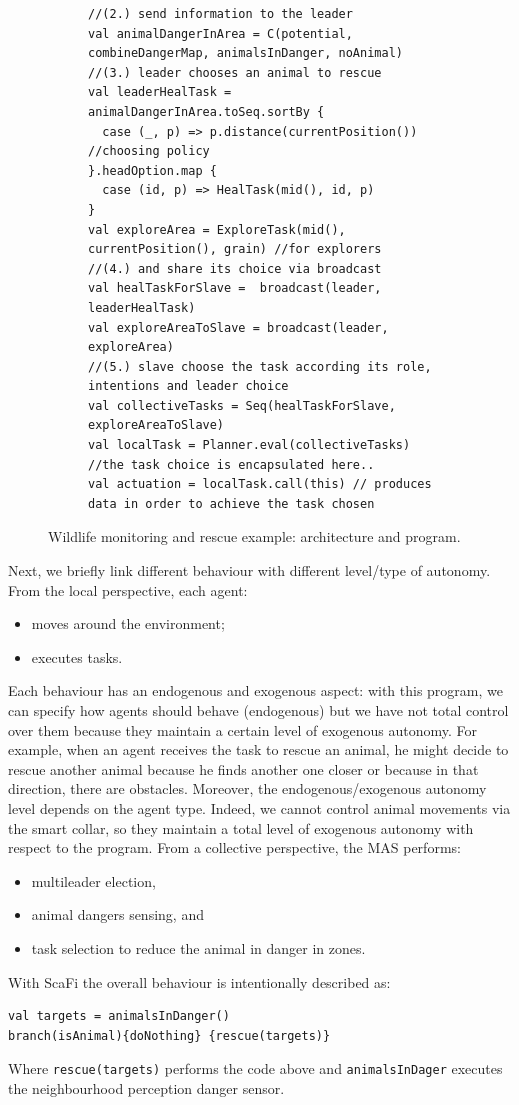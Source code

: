 \begin{figure}[t!]
\begin{subfigure}[b]{\textwidth}
\begin{lstlisting}
//(2.) send information to the leader
val animalDangerInArea = C(potential, combineDangerMap, animalsInDanger, noAnimal)
//(3.) leader chooses an animal to rescue
val leaderHealTask = animalDangerInArea.toSeq.sortBy {
  case (_, p) => p.distance(currentPosition()) //choosing policy
}.headOption.map {
  case (id, p) => HealTask(mid(), id, p)
}
val exploreArea = ExploreTask(mid(), currentPosition(), grain) //for explorers
//(4.) and share its choice via broadcast
val healTaskForSlave =  broadcast(leader, leaderHealTask)
val exploreAreaToSlave = broadcast(leader, exploreArea)
//(5.) slave choose the task according its role, intentions and leader choice
val collectiveTasks = Seq(healTaskForSlave, exploreAreaToSlave)
val localTask = Planner.eval(collectiveTasks) //the task choice is encapsulated here..
val actuation = localTask.call(this) // produces data in order to achieve the task chosen 
\end{lstlisting}
\caption{}
\label{fig:wildlife-code}
\end{subfigure}
%
\caption{Wildlife monitoring and rescue example: architecture and program.}
\label{fig:wildlife-example}
\end{figure}
%
Next, we briefly link different 
 behaviour with different level/type of autonomy. 
%
From the local perspective, each agent:
\begin{itemize}
\item moves around the environment;
\item executes tasks.
\end{itemize}
%
Each behaviour has an endogenous and exogenous aspect: with this program, 
 we can specify how agents should behave (endogenous) but we have not total 
 control over them because they maintain a certain level of exogenous autonomy. 
%
For example, when an agent receives the task to rescue an animal, 
 he might decide to rescue another animal because he finds another one closer or
 because in that direction, there are obstacles. 
%
Moreover, the endogenous/exogenous autonomy level depends on the agent type. 
 Indeed, we cannot control animal movements via the smart collar, 
 so they maintain a total level of exogenous autonomy with respect to the program.
%
From a collective perspective, the MAS performs: 
\begin{itemize}
\item multileader election,
\item animal dangers sensing, and
\item task selection to reduce the animal in danger in zones.
\end{itemize}
%
With ScaFi the overall behaviour is intentionally described as:
\begin{lstlisting}
val targets = animalsInDanger()
branch(isAnimal){doNothing} {rescue(targets)}
\end{lstlisting}
Where \lstinline|rescue(targets)| performs the code above and \lstinline|animalsInDager|
  executes the neighbourhood perception danger sensor.


